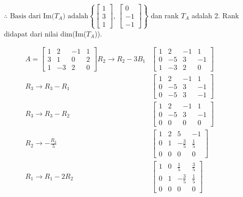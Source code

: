 \documentclass[12pt, a4paper]{scrartcl}
\begin{document}
\begin{enumerate}
\begin{enumerate}
            \begin{itemize}
                \item[$\therefore$] $\mbox{Basis dari Im(}T_A \mbox{) adalah} \left\{ \begin{bmatrix}
                    1\\3\\1
                \end{bmatrix}\mbox{, } \begin{bmatrix}
                    0\\-1\\-1
                \end{bmatrix} \right\}$ dan rank $T_A$ adalah 2. Rank didapat dari nilai dim(Im($T_A$)). 
            \end{itemize}
            \begin{align*}
                A = \begin{bmatrix}
                    1&2&-1&1\\3&1&0&2\\1&-3&2&0
                \end{bmatrix} R_2\to R_2-3B_1 &\begin{bmatrix}
                    1&2&-1&1\\0&-5&3&-1\\1&-3&2&0
                \end{bmatrix} \\R_3\to R_3-R_1 &\begin{bmatrix}
                    1&2&-1&1\\0&-5&3&-1\\0&-5&3&-1
                \end{bmatrix} \\R_3\to R_3-R_2 &\begin{bmatrix}
                    1&2&-1&1\\0&-5&3&-1\\0&0&0&0
                \end{bmatrix} \\R_2\to -\frac{R_2}{5} &\begin{bmatrix}
                    1&2&5&-1\\0&1&-\frac{3}{5}&\frac{1}{5}\\0&0&0&0
                \end{bmatrix} \\R_1\to R_1-2R_2 &\begin{bmatrix}
                    1&0&\frac{1}{5}&\frac{3}{5}\\0&1&-\frac{3}{5}&\frac{1}{5}\\0&0&0&0
                \end{bmatrix}
            \end{align*}


\end{enumerate}
\end{enumerate}
\end{document}
